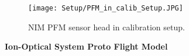 		\begin{figure}[h] %
			\centering
			\texttt{[image: Setup/PFM\_in\_calib\_Setup.JPG]}
			\caption{NIM PFM sensor head in calibration setup.}
			\label{fig:SetupPFM}
		\end{figure}
		
		

		
		\textbf{Ion-Optical System Proto Flight Model}\\
		
